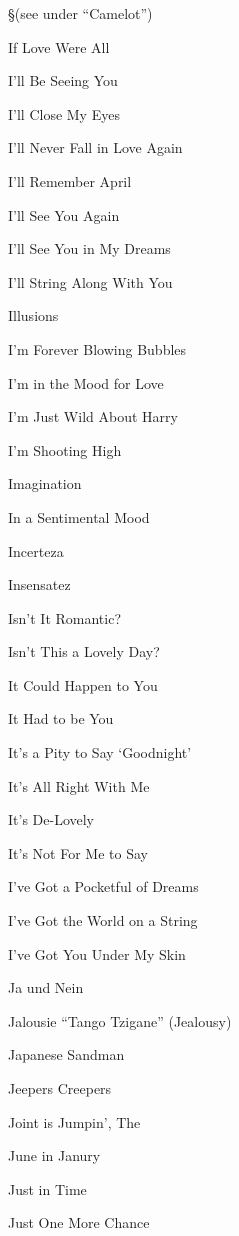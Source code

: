 \nobreak
\S (see under ``Camelot'')

\N If Love Were All


\N I'll Be Seeing You


\N I'll Close My Eyes


\N I'll Never Fall in Love Again


\N I'll Remember April


\N I'll See You Again


\N I'll See You in My Dreams


\N I'll String Along With You


\N Illusions


\N I'm Forever Blowing Bubbles


\N {}


\N I'm in the Mood for Love


\N I'm Just Wild About Harry


\N I'm Shooting High


\N Imagination


\N In a Sentimental Mood


\N Incerteza


\N Insensatez


\N Isn't It Romantic?


\N Isn't This a Lovely Day?


\N It Could Happen to You


\N It Had to be You


\N It's a Pity to Say `Goodnight'


\N It's All Right With Me


\N It's De-Lovely


\N It's Not For Me to Say


\N I've Got a Pocketful of Dreams


\N I've Got the World on a String


\N I've Got You Under My Skin


\N Ja und Nein


\N Jalousie ``Tango Tzigane'' (Jealousy)


\N Japanese Sandman


\N Jeepers Creepers


\N Joint is Jumpin', The


\N June in Janury


\N Just in Time


\N Just One More Chance


